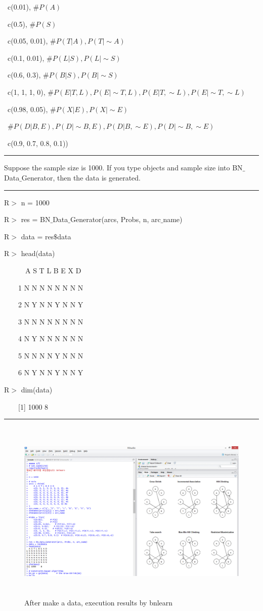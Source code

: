 	~c(0.01),						$\# P(A)$
	
	~c(0.5), 						$\# P(S)$
	
	~c(0.05, 0.01),				$\# P(T|A), P(T|\sim A)$
	
	~c(0.1, 0.01),				$\# P(L|S), P(L|\sim S)$
	
	~c(0.6, 0.3),					$\# P(B|S), P(B|\sim S)$
	
	~c(1, 1, 1, 0),				$\# P(E|T,L), P(E|\sim T,L), P(E|T,\sim L), P(E|\sim T,\sim L)$
	
	~c(0.98, 0.05),				$\# P(X|E), P(X|\sim E)$

	~$\# P(D|B,E), P(D|\sim B,E), P(D|B,\sim E), P(D|\sim B,\sim E)$
	
	~c(0.9, 0.7, 0.8, 0.1))

\begin{center}\rule[0.5ex]{0.9\columnwidth}{1pt}\end{center}

Suppose the sample size is 1000. If you type objects and sample size into BN$\_$Data$\_$Generator, then the data is generated.

\begin{center}\rule[0.5ex]{0.9\columnwidth}{1pt}\end{center}

R$>$ n = 1000
 
R$>$ res = BN$\_$Data$\_$Generator(arcs, Probs, n, arc$\_$name)

R$>$ data = res$\$$data

R$>$ head(data)

~~~~~~A S T L B E X D
  
~~~~1 N N N N N N N N

~~~~2 N Y N N Y N N Y

~~~~3 N N N N N N N N

~~~~4 N Y N N N N N N

~~~~5 N N N N Y N N N

~~~~6 N Y N N Y N N Y

R$>$ dim(data)

~~~~[1] 1000    8

\begin{center}\rule[0.5ex]{0.9\columnwidth}{1pt}\end{center}

\begin{figure}[h]
	\centering
	\includegraphics[height=250pt]{image23}
	\caption{After make a data, execution results by bnlearn}
\end{figure}